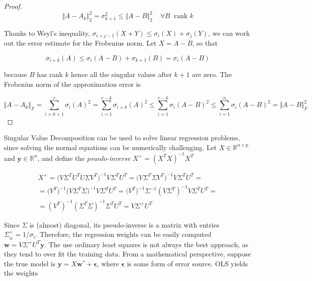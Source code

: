 \documentclass{article}
\numberwithin{equation}{subsection}
\begin{document}
\begin{proof}
    \begin{equation*}
        \Vert A - A_k \Vert_2^2 = \sigma_{k+1}^2 \leq \Vert A - B \Vert^2_2 \;\;\;\; \forall B \;\; \text{rank }k
    \end{equation*}

    Thanks to Weyl's inequality, $\sigma_{i+j-1}(X+Y) \leq \sigma_i(X)+\sigma_j(Y)$, we can work out the error estimate for the Frobenius norm. Let $X = A-B$, so that

    \begin{equation*}
        \sigma_{i+k}(A) \leq \sigma_{i}(A-B) + \sigma_{k+1}(B) = \sigma_{i}(A-B)
    \end{equation*}

    because $B$ has rank $k$ hence all the singular values after $k+1$ are zero. The Frobenius norm of the approximation error is

    \begin{equation*}
        \Vert A - A_k \Vert_F = \sum_{i=k+1}^r \sigma_i(A)^2 = \sum_{i=1}^{r-k} \sigma_{i+k}(A)^2 \leq \sum_{i=1}^{r-k} \sigma_i(A-B)^2 \leq \sum_{i=1}^n \sigma_i(A-B)^2 = \Vert A-B \Vert^2_F
    \end{equation*}
\end{proof}

Singular Value Decomposition can be used to solve linear regression problems, since solving the normal equations can be numerically challenging. Let $X \in \mathbb{R}^{n \times p}$ and $\textbf{y} \in \mathbb{R}^n$, and define the \textit{psuedo-inverse} $X^+ = (X^TX)^{-1} X^T$
 
\begin{gather*}
    X^+ = \Big( V \Sigma^T U^T U \Sigma V^T \Big)^{-1} V \Sigma^T U^T = \Big( V \Sigma^T \Sigma V^T \Big)^{-1} V \Sigma^T U^T = \\
    = \big(V^T\big)^{-1} \big( V \Sigma^T\Sigma)^{-1} V \Sigma^T U^T = \big(V^T\big)^{-1} \Sigma^{-1} (V \Sigma^T)^{-1} V \Sigma^T U^T = \\
    = (V^T)^{-1} (\Sigma^T \Sigma)^{-1} \Sigma^T U^T = V \Sigma^+ U^T
\end{gather*}

Since $\Sigma$ is (almost) diagonal, its pseudo-inverse is a matrix with entries $\Sigma^+_{ii} = 1/\sigma_i$. Therefore, the regression weights can be easily computed $\textbf{w} = V \Sigma^+ U^T \textbf{y}$. The use ordinary least squares is not always the best approach, as they tend to over fit the training data. From a mathematical perspective, suppose the true model is $\textbf{y} = X \textbf{w}^* + \boldsymbol\epsilon$, where $\boldsymbol{\epsilon}$ is some form of error source. OLS yields the weights
\end{document}
